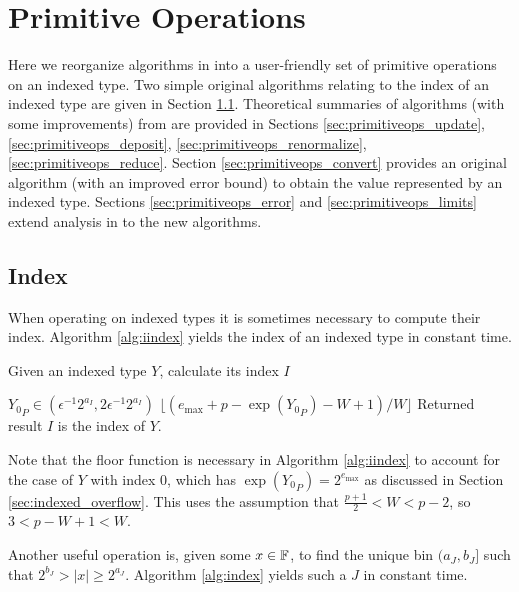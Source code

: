 \section{Primitive Operations}
    Here we reorganize algorithms in \cite{repsum} into a user-friendly set of primitive operations on an indexed type. Two simple original algorithms relating to the index of an indexed type are given in Section \ref{sec:primitiveops_index}. Theoretical summaries of algorithms (with some improvements) from \cite{repsum} are provided in Sections \ref{sec:primitiveops_update}, \ref{sec:primitiveops_deposit}, \ref{sec:primitiveops_renormalize}, \ref{sec:primitiveops_reduce}. Section \ref{sec:primitiveops_convert} provides an original algorithm (with an improved error bound) to obtain the value represented by an indexed type. Sections \ref{sec:primitiveops_error} and \ref{sec:primitiveops_limits} extend analysis in \cite{repsum} to the new algorithms.
  \subsection{Index}
    \label{sec:primitiveops_index}
    When operating on indexed types it is sometimes necessary to compute their index. Algorithm \ref{alg:iindex} yields the index of an indexed type in constant time.

    \begin{samepage}
    \begin{alg}
      Given an indexed type $Y$, calculate its index $I$
      \begin{algorithmic}[1]
        \Require
          \Statex ${Y_0}_P \in (\epsilon^{-1}  2^{a_{I}}, 2  \epsilon^{-1}  2^{a_I})$
          \State \Return $\lfloor(e_{\max} + p - \exp({Y_0}_P) - W + 1)/W\rfloor$
        \EndFunction
        \Ensure
          \Statex Returned result $I$ is the index of $Y$.
      \end{algorithmic}
      \label{alg:iindex}
    \end{alg}
    \end{samepage}

    Note that the floor function is necessary in Algorithm \ref{alg:iindex} to account for the case of $Y$ with index $0$, which has $\exp({Y_0}_P) = 2^{e_{\max}}$ as discussed in Section \ref{sec:indexed_overflow}.
    This uses the assumption that $\frac{p+1}{2} < W < p-2$, so $3 < p - W + 1 < W.$

    Another useful operation is, given some $x \in \mathbb{F}$, to find the unique bin $(a_J, b_J]$ such that $2^{b_J} > |x| \geq 2^{a_J}$. Algorithm \ref{alg:index} yields such a $J$ in constant time.

